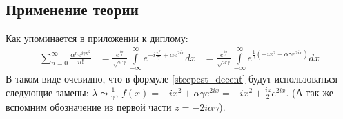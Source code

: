 \documentclass[a4paper, 12pt]{article}
\begin{document}
\subsection*{Применение теории}
Как упоминается в приложении к диплому:
\begin{equation}\label{steepest_decent}
\begin{aligned}
    \sum\limits_{n=0}^{\infty} \frac{\alpha^n e^{i\gamma n^2}}{n!} 
    &= \frac{e^{\frac{i\pi}{4}}}{\sqrt{\pi\gamma}}
    \int\limits_{-\infty}^{\infty}e^{-i \frac{x^2}{\gamma} + \alpha e^{2ix}}dx
    &= \frac{e^{\frac{i\pi}{4}}}{\sqrt{\pi\gamma}}
    \int\limits_{-\infty}^{\infty}e^{\frac{1}{\gamma}\left(-i x^2 + \alpha \gamma e^{2ix}\right)}dx
\end{aligned}
\end{equation}
В таком виде очевидно, что в формуле \ref{steepest_decent} будут использоваться следующие замены: $\lambda\leadsto\frac{1}{\gamma}$, $f(x) = -i x^2 + \alpha \gamma e^{2ix} = -i x^2 + \frac{iz}{2} e^{2ix}$. (А так же вспомним обозначение из первой части $z=-2i\alpha\gamma$).
\end{document}
